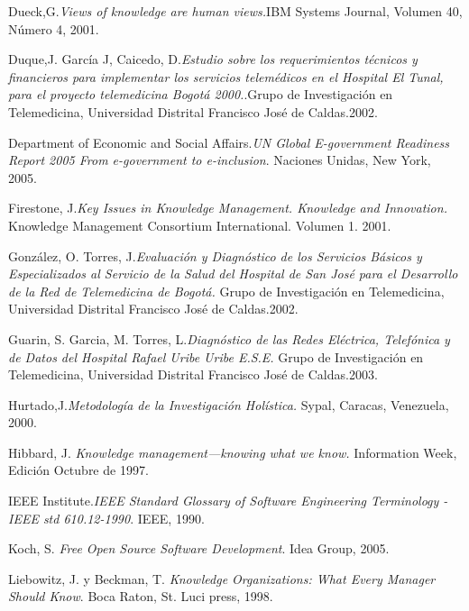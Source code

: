 \begin{thebibliography}{}
 Dueck,G.\textit{Views of knowledge are human views.}IBM Systems Journal, Volumen 40, Número 4, 2001.

 Duque,J. García J, Caicedo, D.\textit{Estudio sobre los requerimientos técnicos y financieros para implementar los servicios telemédicos en el Hospital El Tunal,  para el proyecto telemedicina Bogotá 2000.}.Grupo de Investigación en Telemedicina,  Universidad Distrital Francisco José de Caldas.2002.

 Department of Economic and Social Affairs.\textit{UN Global E-government Readiness Report 2005 From e-government to e-inclusion}. Naciones Unidas, New York, 2005.

 Firestone, J.\textit{Key Issues in Knowledge Management. Knowledge and Innovation.} Knowledge Management Consortium International. Volumen 1. 2001.

 González, O. Torres, J.\textit{Evaluación y Diagnóstico de los Servicios Básicos y Especializados al Servicio de la Salud del Hospital de San José para el Desarrollo de la Red de Telemedicina de Bogotá.} Grupo de Investigación en Telemedicina, Universidad Distrital Francisco José de Caldas.2002.

 Guarin, S. Garcia, M. Torres, L.\textit{Diagnóstico de las Redes Eléctrica, Telefónica y de Datos del Hospital Rafael Uribe Uribe E.S.E.} Grupo de Investigación en Telemedicina,  Universidad Distrital Francisco José de Caldas.2003.

 Hurtado,J.\textit{Metodología de la Investigación Holística.} Sypal, Caracas, Venezuela, 2000.

 Hibbard, J. \textit{Knowledge management—knowing what we know.} Information Week, Edición Octubre de 1997.

 IEEE Institute.\textit{IEEE Standard Glossary of Software Engineering Terminology - IEEE std 610.12-1990}. IEEE, 1990.

 Koch, S. \textit{Free Open Source Software Development}. Idea Group, 2005.

 Liebowitz, J. y Beckman, T. \textit{Knowledge Organizations: What Every Manager Should Know}. Boca Raton, St. Luci press, 1998.


\end{thebibliography}
